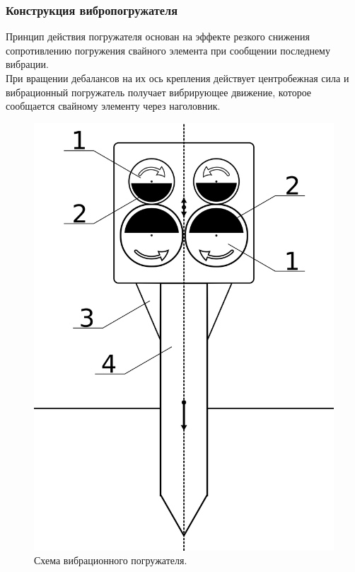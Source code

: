 \documentclass[10pt, pdf, hyperref={unicode}]{beamer}
\begin{document}
    \begin{frame}
        \frametitle{Конструкция вибропогружателя}
        \begin{center}
            \begin{minipage}[h]{0.97\linewidth}
                \begin{minipage}[h]{0.5\linewidth}
                    Принцип действия погружателя основан на эффекте резкого снижения сопротивлению погружения свайного элемента
                    при сообщении последнему вибрации.\\
                    При вращении дебалансов на их ось крепления действует центробежная сила и вибрационный погружатель получает вибрирующее движение,
                    которое сообщается свайному элементу через наголовник.
                \end{minipage}
                \hfill
                \begin{minipage}[h]{0.36\linewidth}
                    \begin{figure}[h]
                        \centering
                        \includegraphics[width=1\linewidth]{../img/scheme_porg_2.png}
                        \caption{Схема вибрационного погружателя.}
                    \end{figure}
                \end{minipage}
            \end{minipage}
        \end{center}
    \end{frame}
\end{document}
